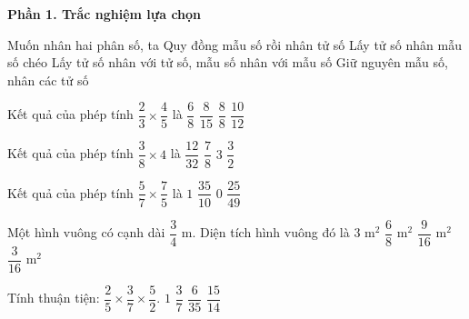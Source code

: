 \textbf{Phần 1. Trắc nghiệm lựa chọn}

\begin{ex} %
Muốn nhân hai phân số, ta
\choice
{Quy đồng mẫu số rồi nhân tử số}
{Lấy tử số nhân mẫu số chéo}
{\True Lấy tử số nhân với tử số, mẫu số nhân với mẫu số}
{Giữ nguyên mẫu số, nhân các tử số}
\end{ex}

\begin{ex} %
Kết quả của phép tính $\dfrac{2}{3} \times \dfrac{4}{5}$ là
\choice
{$\dfrac{6}{8}$}
{\True $\dfrac{8}{15}$}
{$\dfrac{8}{8}$}
{$\dfrac{10}{12}$}
\end{ex}

\begin{ex} %
Kết quả của phép tính $\dfrac{3}{8} \times 4$ là
\choice
{$\dfrac{12}{32}$}
{$\dfrac{7}{8}$}
{$3$}
{\True $\dfrac{3}{2}$}
\end{ex}

\begin{ex} %
Kết quả của phép tính $\dfrac{5}{7} \times \dfrac{7}{5}$ là
\choice
{\True $1$}
{$\dfrac{35}{10}$}
{$0$}
{$\dfrac{25}{49}$}
\end{ex}

\begin{ex} %
Một hình vuông có cạnh dài $\dfrac{3}{4}\text{ m}$. Diện tích hình vuông đó là
\choice
{$3\text{ m}^2$}
{$\dfrac{6}{8}\text{ m}^2$}
{\True $\dfrac{9}{16}\text{ m}^2$}
{$\dfrac{3}{16}\text{ m}^2$}
\end{ex}

\begin{ex} %
Tính thuận tiện: $\dfrac{2}{5} \times \dfrac{3}{7} \times \dfrac{5}{2}$.
\choice
{$1$}
{\True $\dfrac{3}{7}$}
{$\dfrac{6}{35}$}
{$\dfrac{15}{14}$}
\end{ex}

